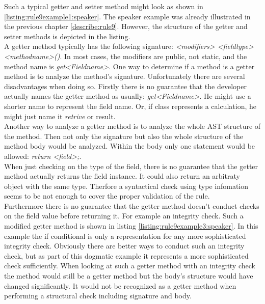 Such a typical getter and setter method might look as shown in \ref{listing:rule9example1:speaker}. The speaker example was already illustrated in the previous chapter \ref{describe:rule9}. However, the structure of the getter and setter methods is depicted in the listing. 
\\

A getter method typically has the following signature: \textit{<modifiers> <fieldtype> <methodname>()}. In most cases, the modifiers are public, not static, and the method name is \textit{get<Fieldname>}. One way to determine if a method is a getter method is to analyze the method's signature. Unfortunately there are several disadvantages when doing so. Firstly there is no guarantee that the developer actually names the getter method as usually: \textit{get<Fieldname>}. He might use a shorter name to represent the field name. Or, if class represents a calculation, he might just name it \textit{retrive} or {result}. 
\\

Another way to analyze a getter method is to analyze the whole \ac{AST} structure of the method. Then not only the signature but also the whole structure of the method body would be analyzed. Within the body only one statement would be allowed: \textit{return <field>;}. 
\\

When just checking on the type of the field, there is no guarantee that the getter method actually returns the field instance. It could also return an arbitraty object with the same type. Therfore a syntactical check using type infomation seems to be not enough to cover the proper validation of the rule. 
\\

Furthermore there is no guarantee that the getter method doesn't conduct checks on the field value before returning it. For example an integrity check. Such a modified getter method is shown in listing \ref{listing:rule9example3:speaker}. In this example the if conditional is only a representation for any more sophisticated integrity check. Obviously there are better ways to conduct such an integrity check, but as part of this dogmatic example it represents a more sophisticated check sufficiently. When looking at such a getter method with an integrity check the method would still be a getter method but the body's structure would have changed significantly. It would not be recognized as a getter method when performing a structural check including signature and body.
\\

